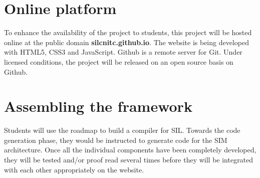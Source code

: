 \section{Online platform}
To enhance the availability of the project to students, this project will be hosted online at the public domain \textbf{silcnitc.github.io}. The website is being developed with HTML5, CSS3 and JavaScript. Github is a remote server for Git. Under licensed conditions, the project will be released on an open source basis on Github. 

\section{Assembling the framework}
Students will use the roadmap to build a compiler for SIL. Towards the code generation phase, they would be instructed to generate code for the SIM architecture\cite{citation-4-name-here}. Once all the individual components have been completely developed, they will be tested and/or proof read several times before they will be integrated with each other appropriately on the website.